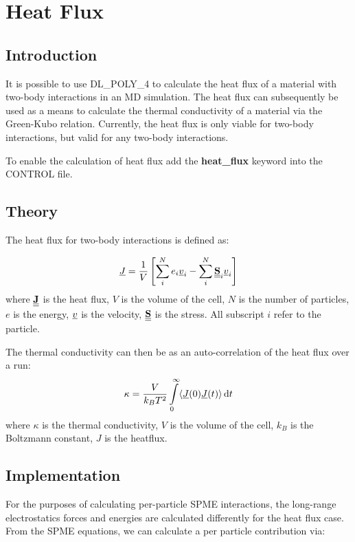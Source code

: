 \section{Heat Flux}

\subsection{Introduction}
It is possible to use DL\_POLY\_4 to calculate the heat flux of a material with two-body interactions in an MD simulation.  The heat flux can subsequently be used as a means to calculate the thermal conductivity of a material via the Green-Kubo relation. Currently, the heat flux is only viable for two-body interactions, but valid for any two-body interactions.

To enable the calculation of heat flux add the {\bf heat\_flux} keyword into the CONTROL file.

\subsection{Theory}
The heat flux for two-body interactions is defined as:

\begin{equation}
\mbox{$\underline{J}$} = \frac{1}{V} \left[ \sum\limits^{N}_{i} e_{i} \mbox{$\underline{v}$}_{i} - \sum\limits^{N}_{i} \mbox{$\underline{\underline{\bf S}}$}_{i} \mbox{$\underline{v}$}_{i} \right]\label{heat-flux-definition}
\end{equation}
where $\mbox{$\underline{\underline{\bf J}}$}$ is the heat flux, $V$ is the volume of the cell, $N$ is the number of particles, $e$ is the energy, $\mbox{$\underline{v}$}$ is the velocity, $\mbox{$\underline{\underline{\bf S}}$}$ is the stress. All subscript $i$ refer to the particle.

The thermal conductivity can then be as an auto-correlation of the heat flux over a run:
\begin{equation}
  \kappa = \frac{V}{k_{B} T^{2}} \int\limits_{0}^{\infty} \langle \mbox{$\underline{J}$}(0)  \mbox{$\underline{J}$}(t) \rangle \, \mathrm{d}t
\end{equation}
where $\kappa$ is the thermal conductivity, $V$ is the volume of the cell, $k_{B}$ is the Boltzmann constant, $J$ is the heatflux.

\subsection{Implementation}
For the purposes of calculating per-particle SPME interactions, the long-range electrostatics forces and energies are calculated differently for the heat flux case. From the SPME equations, we can calculate a per particle contribution via:

